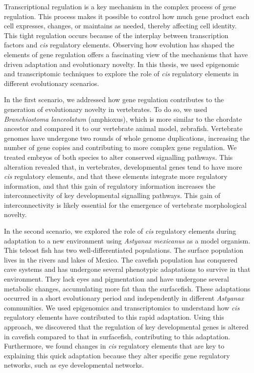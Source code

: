 \documentclass[
11pt, %
english, %
singlespacing, %
headsepline, %
chapterinoneline, %
]{MastersDoctoralThesis} %
\begin{document}
\begin{abstractLite}

\addchaptertocentry{\abstractname}

Transcriptional regulation is a key mechanism in the complex process of gene regulation. This process makes it possible to control how much gene product each cell expresses, changes, or maintains as needed, thereby affecting cell identity. This tight regulation occurs because of the interplay between transcription factors and \textit{cis} regulatory elements. Observing how evolution has shaped the elements of gene regulation offers a fascinating view of the mechanisms that have driven adaptation and evolutionary novelty. In this thesis, we used epigenomic and transcriptomic techniques to explore the role of \textit{cis} regulatory elements in different evolutionary scenarios. 


In the first scenario, we addressed how gene regulation contributes to the generation of evolutionary novelty in vertebrates. To do so, we used \textit{Branchiostoma lanceolatum} (amphioxus), which is more similar to the chordate ancestor and compared it to our vertebrate animal model, zebrafish. Vertebrate genomes have undergone two rounds of whole genome duplications, increasing the number of gene copies and contributing to more complex gene regulation. We treated embryos of both species to alter conserved signalling pathways. This alteration revealed that, in vertebrates, developmental genes tend to have more \textit{cis} regulatory elements, and that these elements integrate more regulatory information, and that this gain of regulatory information increases the interconnectivity of key developmental signalling pathways. This gain of interconnectivity is likely essential for the emergence of vertebrate morphological novelty.


In the second scenario, we explored the role of \textit{cis} regulatory elements during adaptation to a new environment using \textit{Astyanax mexicanus} as a model organism. This teleost fish has two well-differentiated populations. The surface population lives in the rivers and lakes of Mexico. The cavefish population has conquered cave systems and has undergone several phenotypic adaptations to survive in that environment. They lack eyes and pigmentation and have undergone several metabolic changes, accumulating more fat than the surfacefish. These adaptations occurred in a short evolutionary period and independently in different \textit{Astyanax} communities. We used epigenomics and transcriptomics to understand how \textit{cis} regulatory elements have contributed to this rapid adaptation. Using this approach, we discovered that the regulation of key developmental genes is altered in cavefish compared to that in surfacefish, contributing to this adaptation. Furthermore, we found changes in \textit{cis} regulatory elements that are key to explaining this quick adaptation because they alter specific gene regulatory networks, such as eye developmental networks.



\end{abstractLite}
\end{document}
